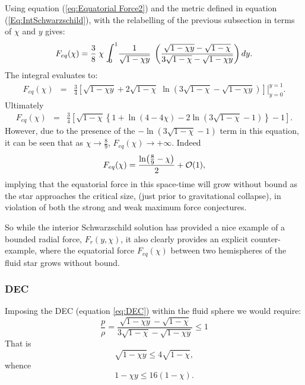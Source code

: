 \documentclass[12pt]{article}
\begin{document}
Using equation (\ref{eq:Equatorial Force2}) and the metric defined in equation (\ref{Eq:IntSchwarzschild}), with the relabelling of the previous subsection in terms of $\chi$ and $y$ gives:
%
\begin{eqnarray}
    F_{eq}(\chi) = \frac{3}{8}\;\chi\; \hbox{\Large $\displaystyle\int$}^1_{\!\!\!\!\!0} \frac{1}{\sqrt{1-\chi y}}\; \left(\frac{\sqrt{1-\chi y}-\sqrt{1-\chi}}{3\sqrt{1-\chi}-\sqrt{1-\chi y}}\right) dy. 
\end{eqnarray}
%
The integral evaluates to:
%
\begin{eqnarray}
    F_{eq}(\chi) &=& \frac{3}{4} \left.\left[\sqrt{1-\chi y} + 2\sqrt{1-\chi}\;\ln(3\sqrt{1-\chi} - \sqrt{1-\chi y}) \right]\right\vert_{y=0}^{y=1}.
\end{eqnarray}
Ultimately 
\begin{eqnarray}
\label{E:Feq-sch}
    F_{eq}(\chi)
        &=&\frac{3}{4}\left[\sqrt{1-\chi}\left\{1 + \ln(4-4\chi)-2\ln(3\sqrt{1-\chi}-1)\right\}-1 \right].
\end{eqnarray}
%
However, due to the presence of the $-\ln(3\sqrt{1-\chi}-1)$ term in this equation, it can be seen that as $\chi \rightarrow \frac{8}{9}$, $F_{eq}(\chi) \rightarrow +\infty$.
Indeed
\begin{equation}
F_{eq}(\chi) = {\ln({8\over9}-\chi)\over 2} + {\mathcal{O}}(1),
\end{equation}
implying that the equatorial force in this space-time will grow without bound as the star approaches the critical size, (just prior to gravitational collapse), in violation of both the strong and weak maximum force conjectures.

So while the interior Schwarzschild solution has provided a nice example of a bounded radial force, $F_r(y,\chi)$,  it also clearly provides an explicit  counter-example, where the equatorial force $F_{eq}(\chi)$ between two hemispheres of the fluid star grows without bound.

\subsubsection{DEC}
Imposing the DEC (equation \ref{eq:DEC}) within the fluid sphere we would require:
%
\begin{equation}
\frac{p}{\rho}=\frac{\sqrt{1-\chi y}-\sqrt{1-\chi}}{3\sqrt{1-\chi}-\sqrt{1-\chi y}}\leq1
\end{equation}
%
\enlargethispage{20pt}
That is
\begin{equation}
\sqrt{1-\chi y} \leq 4\sqrt{1-\chi},
\end{equation}
whence
\begin{equation}
1-\chi y \leq 16(1-\chi). 
\end{equation}
\end{document}
